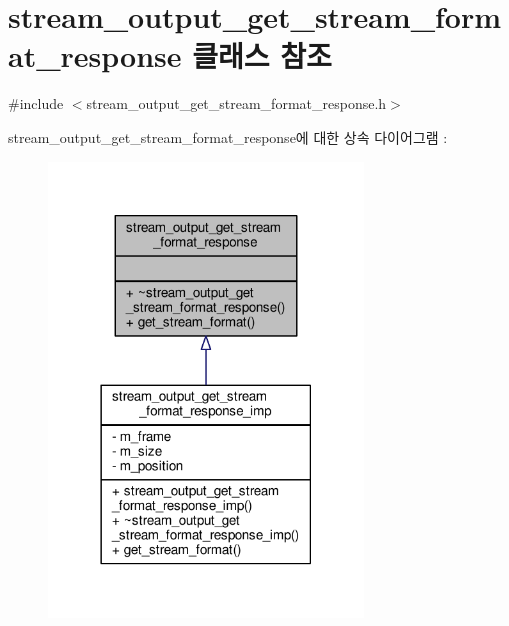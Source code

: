 \hypertarget{classavdecc__lib_1_1stream__output__get__stream__format__response}{}\section{stream\+\_\+output\+\_\+get\+\_\+stream\+\_\+format\+\_\+response 클래스 참조}
\label{classavdecc__lib_1_1stream__output__get__stream__format__response}


{\ttfamily \#include $<$stream\+\_\+output\+\_\+get\+\_\+stream\+\_\+format\+\_\+response.\+h$>$}



stream\+\_\+output\+\_\+get\+\_\+stream\+\_\+format\+\_\+response에 대한 상속 다이어그램 \+: 
\nopagebreak
\begin{figure}[H]
\begin{center}
\leavevmode
\includegraphics[width=237pt]{classavdecc__lib_1_1stream__output__get__stream__format__response__inherit__graph}
\end{center}
\end{figure}


